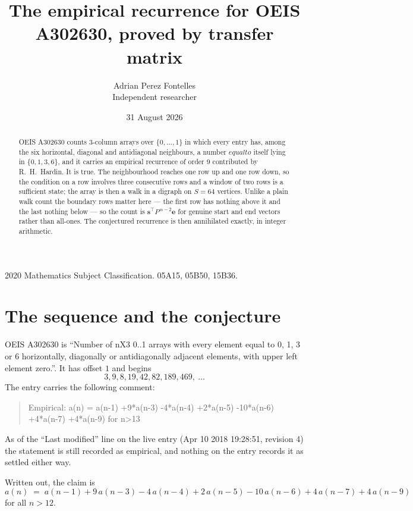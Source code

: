 \documentclass[11pt,a4paper]{article}
\title{The empirical recurrence for OEIS A302630, proved by transfer matrix}
\author{Adrian Perez Fontelles\\ \small Independent researcher}
\date{31 August 2026}
\theoremstyle{plain}
\theoremstyle{definition}
\begin{document}
\maketitle

\begin{abstract}
OEIS A302630 counts $3$-column arrays over $\{0,\dots,1\}$ in which every entry has,
among the six horizontal, diagonal and antidiagonal neighbours, a number $equal to$ itself lying in $\{0,1,3,6\}$, and it carries an empirical
recurrence of order $9$ contributed by R.~H.~Hardin. It is true. The neighbourhood
reaches one row up and one row down, so the condition on a row involves three consecutive
rows and a window of two rows is a sufficient state; the array is then a walk in a digraph
on $S=64$ vertices. Unlike a plain walk count the boundary rows matter here --- the first
row has nothing above it and the last nothing below --- so the count is
$\mathbf{s}^{\!\top}P^{\,n-2}\mathbf{e}$ for genuine start and end vectors rather than
all-ones. The conjectured recurrence is then annihilated exactly, in integer arithmetic.
\end{abstract}

\noindent\small 2020 Mathematics Subject Classification. 05A15, 05B50, 15B36.\normalsize

\section{The sequence and the conjecture}

OEIS A302630 is ``Number of nX3 0..1 arrays with every element equal to 0, 1, 3 or 6 horizontally, diagonally or antidiagonally adjacent elements, with upper left element zero.''. It has offset
$1$ and begins
\[
3, 9, 8, 19, 42, 82, 189, 469,\ \dots
\]
The entry carries the following comment:
\begin{quote}\small
Empirical: a(n) = a(n-1) +9*a(n-3) -4*a(n-4) +2*a(n-5) -10*a(n-6) +4*a(n-7) +4*a(n-9) for n>13
\end{quote}
As of the ``Last modified'' line on the live entry (Apr 10 2018 19:28:51, revision
4) the statement is still recorded as empirical, and nothing on the entry
records it as settled either way.

Written out, the claim is
\begin{equation}\label{eq:conj}
a(n)\;=\;a(n-1) + 9\,a(n-3) - 4\,a(n-4) + 2\,a(n-5) - 10\,a(n-6) + 4\,a(n-7) + 4\,a(n-9)
\end{equation}
for all $n>12$.
\end{document}
